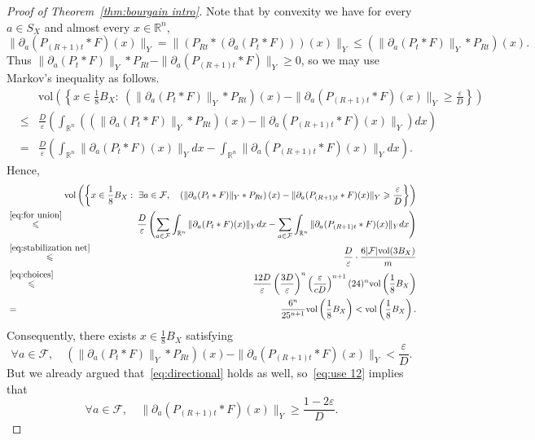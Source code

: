 \documentclass[12pt,reqno]{amsart}
\theoremstyle{plain}
\theoremstyle{definition}
\newcommand{\e}{\varepsilon}
\renewcommand{\le}{\leqslant}
\renewcommand{\ge}{\geqslant}
\newcommand{\R}{\mathbb R}
\newcommand{\vol}{\mathrm{vol}}
\begin{document}
\begin{proof}[Proof of Theorem~\ref{thm:bourgain intro}]
Note that by convexity we have for every $a\in S_X$ and almost every $x\in \R^n$,
$$
\|\partial_a(P_{(R+1)t}*F)(x)\|_Y= \|\left(P_{Rt}*\left(\partial_a(P_{t}*F)\right)\right)(x)\|_Y\le \left(\|\partial_a(P_t*F)\|_Y*P_{Rt}\right)(x).
$$
Thus $\|\partial_a(P_t*F)\|_Y*P_{Rt}-\|\partial_a(P_{(R+1)t}*F)\|_Y\ge 0$, so we may use Markov's inequality as follows.
\begin{eqnarray}\label{eq:for union}
&&\nonumber\!\!\!\!\!\!\!\!\!\!\!\!\!\!\!\!\!\!\!\!\!\!\!\!\!\!\!\!\!\!\!\!\vol\left(\left\{x\in \frac18B_X:\ \left(\|\partial_a(P_t*F)\|_Y*P_{Rt}\right)(x)-\|\partial_a(P_{(R+1)t}*F)(x)\|_Y\ge \frac{\e}{D}\right\}\right)\\\nonumber&\le&
\frac{D}{\e}\left(\int_{\R^n}\left(\left(\|\partial_a(P_t*F)\|_Y*P_{Rt}\right)(x)-\|\partial_a(P_{(R+1)t}*F)(x)\|_Y\right)dx\right)\\&=&\frac{D}{\e}\left(\int_{\R^n} \|\partial_a(P_t*F)(x)\|_Ydx-
\int_{\R^n} \|\partial_a(P_{(R+1)t}*F)(x)\|_Ydx\right).
\end{eqnarray}
Hence,
\begin{eqnarray*}
&&\nonumber\!\!\!\!\!\!\!\!\!\!\!\!\!\!\!\!\!\!\!\!\!\!\!\vol\left(\left\{x\in \frac18B_X:\ \exists a\in \mathcal F,\ \ \ \left(\|\partial_a(P_t*F)\|_Y*P_{Rt}\right)(x)-\|\partial_a(P_{(R+1)t}*F)(x)\|_Y\ge \frac{\e}{D}\right\}\right)\\
&\stackrel{\eqref{eq:for union}}{\le}& \frac{D}{\e}\left(\sum_{a\in \mathcal F}\int_{\R^n} \|\partial_a(P_t*F)(x)\|_Ydx-\sum_{a\in \mathcal F}\int_{\R^n} \|\partial_a(P_{(R+1)t}*F)(x)\|_Ydx\right)\\
&\stackrel{\eqref{eq:stabilization net}}{\le}& \frac{D}{\e}\cdot\frac{6|\mathcal F|\vol(3B_X)}{m}\\
&\stackrel{\eqref{eq:choices}}{\le}& \frac{12D}{\e}\left(\frac{3D}{\e}\right)^n\left(\frac{\e}{cD}\right)^{n+1}(24)^n\vol\left(\frac18 B_X\right)\\
&=&\frac{6^n}{25^{n+1}}\vol\left(\frac18 B_X\right)<\vol\left(\frac18 B_X\right).
\end{eqnarray*}
Consequently, there exists $x\in \frac18B_X$ satisfying
\begin{equation}\label{eq:use 12}
\forall a\in \mathcal F,\quad\left(\|\partial_a(P_t*F)\|_Y*P_{Rt}\right)(x)-\|\partial_a(P_{(R+1)t}*F)(x)\|_Y< \frac{\e}{D}.
 \end{equation}
 But we already argued that~\eqref{eq:directional} holds as well, so~\eqref{eq:use 12} implies that
\begin{equation}\label{eq:at a}
\forall a\in \mathcal F,\quad \|\partial_a(P_{(R+1)t}*F)(x)\|_Y\ge \frac{1-2\e}{D}.

\end{equation}
\end{proof}
\end{document}
